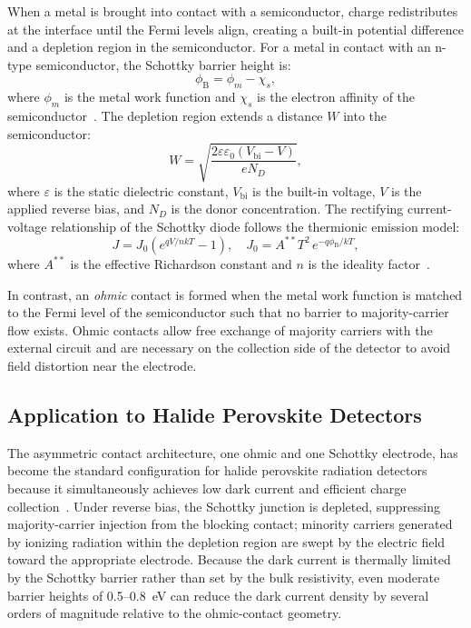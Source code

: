 When a metal is brought into contact with a semiconductor, charge
redistributes at the interface until the Fermi levels align, creating
a built-in potential difference and a depletion region in the
semiconductor.  For a metal in contact with an n-type semiconductor,
the Schottky barrier height is:
\begin{equation}
  \phi_{\mathrm{B}} = \phi_m - \chi_s,
  \label{eq:schottky_barrier}
\end{equation}
where $\phi_m$ is the metal work function and $\chi_s$ is the electron
affinity of the semiconductor~\cite{Sze2007}.  The depletion region
extends a distance $W$ into the semiconductor:
\begin{equation}
  W = \sqrt{\frac{2\varepsilon\varepsilon_0 (V_{\mathrm{bi}} - V)}{e N_D}},
  \label{eq:depletion_width}
\end{equation}
where $\varepsilon$ is the static dielectric constant, $V_{\mathrm{bi}}$
is the built-in voltage, $V$ is the applied reverse bias, and $N_D$
is the donor concentration.  The rectifying current-voltage relationship
of the Schottky diode follows the thermionic emission model:
\begin{equation}
  J = J_0\left(e^{qV/nkT} - 1\right), \quad
  J_0 = A^{**}T^2\,e^{-q\phi_{\mathrm{B}}/kT},
  \label{eq:IV_schottky}
\end{equation}
where $A^{**}$ is the effective Richardson constant and $n$ is the
ideality factor~\cite{Sze2007}.

In contrast, an \emph{ohmic} contact is formed when the metal work
function is matched to the Fermi level of the semiconductor such that
no barrier to majority-carrier flow exists.  Ohmic contacts allow
free exchange of majority carriers with the external circuit and are
necessary on the collection side of the detector to avoid field
distortion near the electrode.

\subsection{Application to Halide Perovskite Detectors}

The asymmetric contact architecture, one ohmic and one Schottky
electrode, has become the standard configuration for halide perovskite
radiation detectors because it simultaneously achieves low dark current
and efficient charge collection~\cite{Wei2016}.  Under reverse bias, the
Schottky junction is depleted, suppressing majority-carrier injection
from the blocking contact; minority carriers generated by ionizing
radiation within the depletion region are swept by the electric field
toward the appropriate electrode.  Because the dark current is
thermally limited by the Schottky barrier rather than set by the bulk
resistivity, even moderate barrier heights of 0.5--0.8~eV can reduce
the dark current density by several orders of magnitude relative to the
ohmic-contact geometry.

